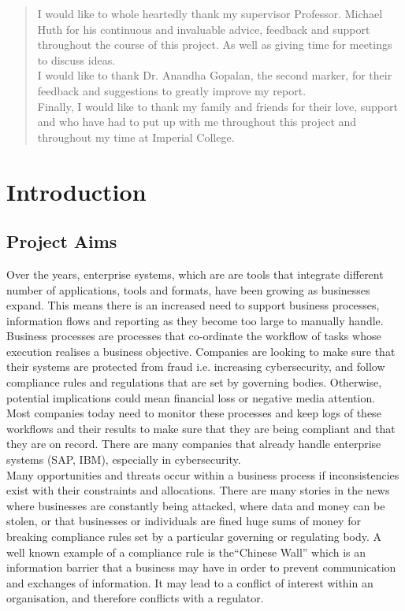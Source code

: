 \documentclass[a4paper]{report}
\begin{document}
\renewcommand{\abstractname}{Acknowledgements}
\begin{abstract}
I would like to whole heartedly thank my supervisor Professor. Michael Huth for his continuous and invaluable advice, feedback and support throughout the course of this project. As well as giving time for meetings to discuss ideas. \\

I would like to thank Dr. Anandha Gopalan, the second marker, for their feedback and suggestions to greatly improve my report. \\

Finally, I would like to thank my family and friends for their love, support and who have had to put up with me throughout this project and throughout my time at Imperial College.  
\end{abstract}

\tableofcontents

\chapter{Introduction}
\section{Project Aims}
Over the years, enterprise systems\cite{enterpriseSystems}, which are are tools that integrate different number of applications, tools and formats, have been growing as businesses expand. This means there is an increased need to support business processes, information flows and reporting as they become too large to manually handle. Business processes are processes that co-ordinate the workflow of tasks whose execution realises a business objective. Companies are looking to make sure that their systems are protected from fraud i.e. increasing cybersecurity, and follow compliance rules and regulations that are set by governing bodies. Otherwise, potential implications could mean financial loss or negative media attention. \\

Most companies today need to monitor these processes and keep logs of these workflows and their results to make sure that they are being compliant and that they are on record. There are many companies that already handle enterprise systems (SAP, IBM), especially in  cybersecurity. \\

Many opportunities and threats occur within a business process if inconsistencies exist with their constraints and allocations. There are many stories in the news where businesses are constantly being attacked, where data and money can be stolen, or that businesses or individuals are fined huge sums of money for breaking compliance rules set by a particular governing or regulating body. A well known example of a compliance rule is the``Chinese Wall''\cite{ChineseWall} which is an information barrier that a business may have in order to prevent communication and exchanges of information. It may lead to a conflict of interest within an organisation, and therefore conflicts with a regulator.\\
\end{document}

